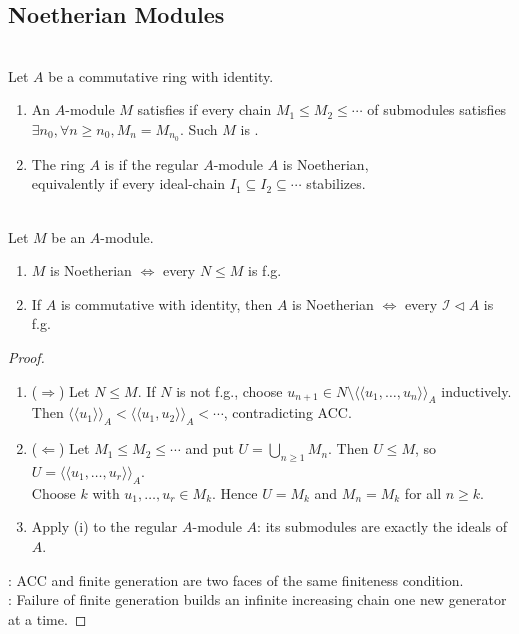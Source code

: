 \subsection{Noetherian Modules}

\begin{definition} \label{def:noetherian-module-ring-acc} \\
Let $A$ be a commutative ring with identity.
\begin{enumerate}[label=(\roman*)]
\setlength{\itemsep}{0pt}
\item An $A$-module $M$ satisfies  if every chain $M_1\leq M_2\leq\cdots$ of submodules satisfies\\
$\exists n_0, \forall n\geq n_0, M_n=M_{n_0}$. Such $M$ is .
\item The ring $A$ is  if the regular $A$-module $A$ is Noetherian,\\ equivalently if every ideal-chain $I_1\subseteq I_2\subseteq\cdots$ stabilizes.
\end{enumerate}
\end{definition}

\begin{theorem} \label{thm:noetherian-iff-submodules-finitely-generated} \\
Let $M$ be an $A$-module.
\begin{enumerate}[label=(\roman*)]
\setlength{\itemsep}{0pt}
\item $M$ is Noetherian $\Longleftrightarrow$ every $N\leq M$ is f.g.
\item If $A$ is commutative with identity, then $A$ is Noetherian
$\Longleftrightarrow$ every $\mathcal{I}\lhd A$ is f.g.
\end{enumerate}
\begin{proof}
\begin{enumerate}[label=(\roman*).]
\setlength{\itemsep}{0pt}
\item[$(i)$]($\Rightarrow$) Let $N\leq M$. If $N$ is not f.g., choose $u_{n+1}\in N\setminus\langle\!\langle u_1,\ldots,u_n\rangle\!\rangle_A$ inductively.\\
Then $\langle\!\langle u_1\rangle\!\rangle_A< \langle\!\langle u_1,u_2\rangle\!\rangle_A<\cdots$, contradicting ACC.
\item[$(i)$]($\Leftarrow$) Let $M_1\leq M_2\leq\cdots$ and put $U=\bigcup_{n\geq1}M_n$. Then $U\leq M$, so $U=\langle\!\langle u_1,\ldots,u_r\rangle\!\rangle_A$.\\
Choose $k$ with $u_1,\ldots,u_r\in M_k$. Hence $U=M_k$ and $M_n=M_k$ for all $n\geq k$.
\item[$(ii)$] Apply (i) to the regular $A$-module $A$: its submodules are exactly the ideals of $A$.
\end{enumerate}
\noindent
{}: ACC and finite generation are two faces of the same finiteness condition.\\
: Failure of finite generation builds an infinite increasing chain one new generator at a time.
\end{proof}
\end{theorem}

